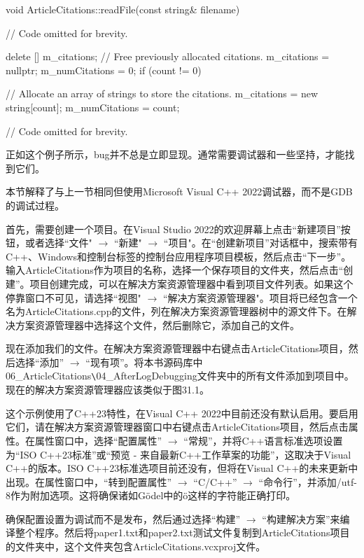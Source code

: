 \begin{cpp}
void ArticleCitations::readFile(const string& filename)
{
    // Code omitted for brevity.

    delete [] m_citations; // Free previously allocated citations.
    m_citations = nullptr;
    m_numCitations = 0;
    if (count != 0) {
        // Allocate an array of strings to store the citations.
        m_citations = new string[count];
        m_numCitations = count;

        // Code omitted for brevity.
    }
}
\end{cpp}

正如这个例子所示，bug并不总是立即显现。通常需要调试器和一些坚持，才能找到它们。


本节解释了与上一节相同但使用Microsoft Visual C++ 2022调试器，而不是GDB的调试过程。

首先，需要创建一个项目。在Visual Studio 2022的欢迎屏幕上点击“新建项目”按钮，或者选择“文件" $\rightarrow$ “新建" $\rightarrow$ “项目"。在“创建新项目”对话框中，搜索带有C++、Windows和控制台标签的控制台应用程序项目模板，然后点击“下一步”。输入ArticleCitations作为项目的名称，选择一个保存项目的文件夹，然后点击“创建”。项目创建完成，可以在解决方案资源管理器中看到项目文件列表。如果这个停靠窗口不可见，请选择“视图" $\rightarrow$ “解决方案资源管理器"。项目将已经包含一个名为ArticleCitations.cpp的文件，列在解决方案资源管理器树中的源文件下。在解决方案资源管理器中选择这个文件，然后删除它，添加自己的文件。

现在添加我们的文件。在解决方案资源管理器中右键点击ArticleCitations项目，然后选择“添加” $\rightarrow$ “现有项”。将本书源码库中06\_ArticleCitations\verb|\|04\_AfterLogDebugging文件夹中的所有文件添加到项目中。现在的解决方案资源管理器应该类似于图31.1。


这个示例使用了C++23特性，在Visual C++ 2022中目前还没有默认启用。要启用它们，请在解决方案资源管理器窗口中右键点击ArticleCitations项目，然后点击属性。在属性窗口中，选择“配置属性” $\rightarrow$ “常规”，并将C++语言标准选项设置为“ISO C++23标准”或“预览 - 来自最新C++工作草案的功能”，这取决于Visual C++的版本。ISO C++23标准选项目前还没有，但将在Visual C++的未来更新中出现。在属性窗口中，“转到配置属性” $\rightarrow$ “C/C++” $\rightarrow$ “命令行”，并添加/utf-8作为附加选项。这将确保诸如Gödel中的ö这样的字符能正确打印。

确保配置设置为调试而不是发布，然后通过选择“构建” $\rightarrow$ “构建解决方案”来编译整个程序。然后将paper1.txt和paper2.txt测试文件复制到ArticleCitations项目的文件夹中，这个文件夹包含ArticleCitations.vcxproj文件。

